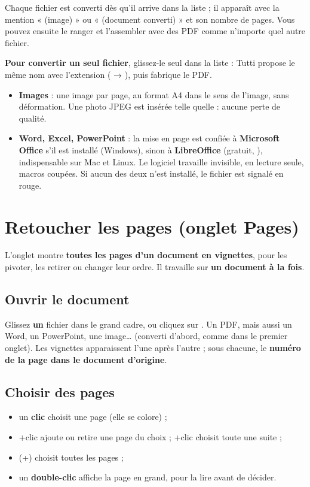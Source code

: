 Chaque fichier est converti dès qu'il arrive dans la liste ; il apparaît avec la mention
« (image) » ou « (document converti) » et son nombre de pages. Vous pouvez ensuite le ranger
et l'assembler avec des PDF comme n'importe quel autre fichier.

\textbf{Pour convertir un seul fichier}, glissez-le seul dans la liste : Tutti propose
le même nom avec l'extension  ( → ),
puis  fabrique le PDF.

\begin{itemize}
\item \textbf{Images} : une image par page, au format A4 dans le sens de l'image, sans déformation.
      Une photo JPEG est insérée telle quelle : aucune perte de qualité.
\item \textbf{Word, Excel, PowerPoint} : la mise en page est confiée à \textbf{Microsoft Office}
      s'il est installé (Windows), sinon à \textbf{LibreOffice} (gratuit, ),
      indispensable sur Mac et Linux. Le logiciel travaille invisible, en lecture seule, macros coupées.
      Si aucun des deux n'est installé, le fichier est signalé en rouge.
\end{itemize}

\section{Retoucher les pages (onglet Pages)}\label{sec:pages}

L'onglet  montre \textbf{toutes les pages d'un document en vignettes}, pour les
pivoter, les retirer ou changer leur ordre. Il travaille sur \textbf{un document à la fois}.

\subsection{Ouvrir le document}
Glissez \textbf{un} fichier dans le grand cadre, ou cliquez sur .
Un PDF, mais aussi un Word, un PowerPoint, une image… (converti d'abord, comme dans le premier
onglet). Les vignettes apparaissent l'une après l'autre ; sous chacune, le \textbf{numéro de la
page dans le document d'origine}.


\subsection{Choisir des pages}
\begin{itemize}
\item un \textbf{clic} choisit une page (elle se colore) ;
\item {}+clic ajoute ou retire une page du choix ; +clic choisit toute une suite ;
\item {} (+) choisit toutes les pages ;
\item un \textbf{double-clic} affiche la page en grand, pour la lire avant de décider.
\end{itemize}

